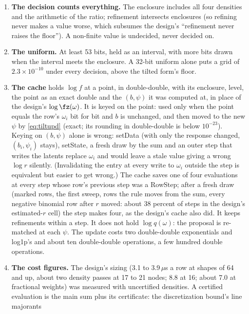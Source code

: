\begin{enumerate}
step is still invariant and converges from almost every start, so the rounding buys uniform ergodicity and the
minorization Theorem~\ref{thm:starts}(a) uses, not invariance (Remark~\ref{rem:r1}).
\item \textbf{The decision counts everything.} The enclosure includes all four densities and the arithmetic of the
ratio; refinement intersects enclosures (so refining never makes a value worse, which subsumes the design's
``refinement never raises the floor''). A non-finite value is undecided, never decided on.
\item \textbf{The uniform.} At least 53 bits, held as an interval, with more bits drawn when the interval meets the
enclosure. A 32-bit uniform alone puts a grid of $2.3\times10^{-10}$ under every decision, above the tilted form's
floor.
\item \textbf{The cache} holds $\log f$ at a point, in double-double, with its enclosure, level, the point as an
exact double and the $(b,\psi)$ it was computed at, in place of the design's $\log\fz(\omega)$. It is keyed on the
point: used only when the point equals the row's $\omega_i$ bit for bit and $b$ is unchanged, and then moved to the
new $\psi$ by \eqref{eq:tiltupd} (exact; its rounding in double-double is below $10^{-23}$). Keying on $(b,\psi)$
alone is wrong: setData (with only the response changed, $(b_i,\psi_i)$ stays), setState, a fresh draw by the sum
and an outer step that writes the latents replace $\omega_i$ and would leave a stale value giving a wrong $\log r$
silently. (Invalidating the entry at every write to $\omega_i$ outside the step is equivalent but easier to get
wrong.) The cache saves one of four evaluations at every step whose row's previous step was a RowStep; after a
fresh draw (marked rows, the first sweep, rows the rule moves from the sum, every negative binomial row after $r$
moved: about 38 percent of steps in the design's estimated-$r$ cell) the step makes four, as the design's cache
also did. It keeps refinements within a step. It does not hold $\log q(\omega)$: the proposal is re-matched at each
$\psi$. The update costs two double-double exponentials and log1p's and about ten double-double operations, a few
hundred double operations.
\item \textbf{The cost figures.} The design's sizing (3.1 to 3.9\,$\mu$s a row at shapes of 64 and up, about two
density passes at 17 to 21 nodes; 8.8 at 16; about 7.0 at fractional weights) was measured with uncertified
densities. A certified evaluation is the main sum plus its certificate: the discretization bound's line majorants

\end{enumerate}
